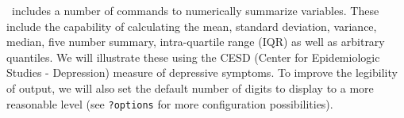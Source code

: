 \R\ includes a number of commands to numerically summarize variables.
These include the capability of calculating the mean, standard deviation,
variance, median, five number summary, intra-quartile range (IQR) as well as arbitrary quantiles.  We will
illustrate these using the CESD (Center for Epidemiologic Studies - Depression)
measure of depressive symptoms.  To improve the legibility of output,
we will also set the default number of digits to display to a more reasonable
level (see {\tt ?options} for more configuration possibilities).

\begin{knitrout}
\end{knitrout}

\begin{knitrout}
\end{knitrout}

\begin{knitrout}
\end{knitrout}



